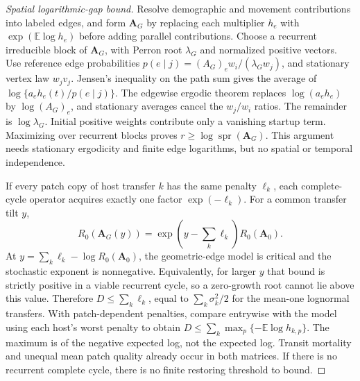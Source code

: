 \begin{proof}[Spatial logarithmic-gap bound]
Resolve demographic and movement contributions into labeled edges, and form \(\mathbf A_G\) by replacing each multiplier \(h_e\) with \(\exp(\mathbb E\log h_e)\) before adding parallel contributions. Choose a recurrent irreducible block of \(\mathbf A_G\), with Perron root \(\lambda_G\) and normalized positive vectors. Use reference edge probabilities
\(p(e\mid j)=(A_G)_e w_i/(\lambda_Gw_j)\), and stationary vertex law \(w_jv_j\). Jensen's inequality on the path sum gives the average of
\(\log\{a_eh_e(t)/p(e\mid j)\}\).
The edgewise ergodic theorem replaces \(\log(a_eh_e)\) by \(\log(A_G)_e\), and stationary averages cancel the \(w_j/w_i\) ratios. The remainder is \(\log\lambda_G\). Initial positive weights contribute only a vanishing startup term. Maximizing over recurrent blocks proves
\(r\geq\log\operatorname{spr}(\mathbf A_G)\).
This argument needs stationary ergodicity and finite edge logarithms, but no spatial or temporal independence.

If every patch copy of host transfer \(k\) has the same penalty \(\ell_k\), each complete-cycle operator acquires exactly one factor \(\exp(-\ell_k)\). For a common transfer tilt \(y\),
\[
 R_0(\mathbf A_G(y))=\exp\left(y-\sum_k\ell_k\right)R_0(\mathbf A_0).
\]
At \(y=\sum_k\ell_k-\log R_0(\mathbf A_0)\), the geometric-edge model is critical and the stochastic exponent is nonnegative. Equivalently, for larger \(y\) that bound is strictly positive in a viable recurrent cycle, so a zero-growth root cannot lie above this value. Therefore \(D\leq\sum_k\ell_k\), equal to \(\sum_k\sigma_k^2/2\) for the mean-one lognormal transfers. With patch-dependent penalties, compare entrywise with the model using each host's worst penalty to obtain \(D\leq\sum_k\max_p\{-\mathbb E\log h_{k,p}\}\). The maximum is of the negative expected log, not the expected log. Transit mortality and unequal mean patch quality already occur in both matrices. If there is no recurrent complete cycle, there is no finite restoring threshold to bound.
\end{proof}

